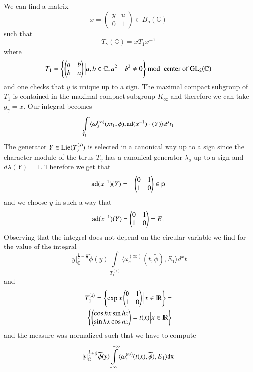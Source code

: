 We can find a matrix
$$
x=\left(\begin{matrix} y & u\\ 0 & 1\end{matrix}\right)\in B_{o}(\mathbb{C})
$$
such that
$$
T_{\gamma}(\mathbb{C})=xT_{1}x^{-1}
$$
where\pageoriginale
$$
T_{1}=\left\{\left(\begin{matrix} a & b\\ b & a\end{matrix}\right)\Big| a,b\in \mathbb{C}, a^{2}-b^{2}\neq 0\right\}{\rm{mod}}\kern.3em \text{ center of } \mathrm{GL}_{2}(\mathbb{C})
$$
and one checks that $y$ is unique up to a sign. The maximal compact subgroup of $T_{1}$ is contained in the maximal compact subgroup $K_{\infty}$ and therefore we can take $g_{\gamma}=x$. Our integral becomes
$$
\int\limits_{T_{1}}\langle \omega^{(\infty)}_{s}(xt_{1},\phi),\operatorname{ad}(x^{-1})\cdot (Y)\rangle d^{x}t_{1}
$$
The generator $Y\in \operatorname{Lie} (T^{(s)}_{\gamma})$ is selected in a canonical way up to a sign since the character module of the torus $T_{\gamma}$ has a canonical generator $\lambda_{o}$ up to a sign and $d\lambda(Y)=1$. Therefore we get that
$$
\operatorname{ad}(x^{-1})(Y)=\pm\left(\begin{matrix} 0 & 1\\ 1 & 0\end{matrix}\right)\in \mathsf{p}
$$
and we choose $y$ in such a way that
$$
\operatorname{ad}(x^{-1})(Y)=\left(\begin{matrix} 0 & 1\\ 1 & 0\end{matrix}\right)=E_{1}
$$
Observing that the integral does not depend on the circular variable we find for the value of the integral
$$
|y|^{\frac{1}{2}+\frac{s}{2}}_{\mathbb{C}}\widetilde{\phi}(y)\int\limits_{T_{1}^{(s)}}\langle \omega^{(\infty)}_{s}(t,\widetilde{\phi}),E_{1}\rangle d^{x}t
$$
and
\begin{align*}
T^{(s)}_{1}=\left\{\exp x\left(\begin{matrix} 0 & 1\\ 1 & 0\end{matrix}\right)\Big| x\in \operatorname{I\kern -1.2pt R}\right\}=\\
\left\{\left(\begin{matrix} \cos hx \sin hx\\ \sin hx\cos nx\end{matrix}\right)=t(x)\Big| x\in \operatorname{I\kern -1.2pt R}\right\}
\end{align*}
and the measure was normalized such that we have to compute
$$
|y|^{\frac{1}{2}+\frac{s}{2}}_{\mathbb{C}}\widetilde{\phi}(y)\int\limits^{+\infty}_{-\infty}\langle \omega^{(\infty)}_{s}(t(x),\widetilde{\phi}),E_{1}\rangle \mathrm{dx}
$$
